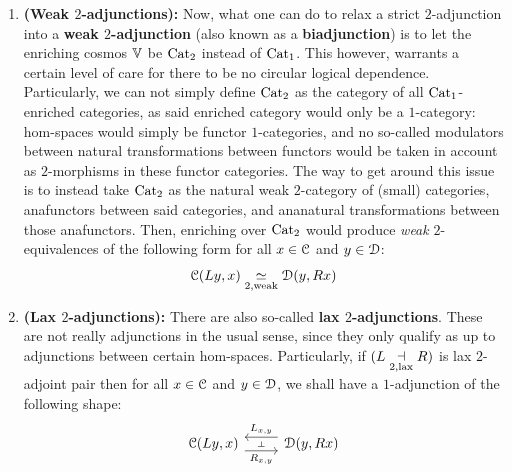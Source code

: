 \begin{remark}
\begin{enumerate}
                        \item \textbf{(Weak $2$-adjunctions):} Now, what one can do to relax a strict $2$-adjunction into a \textbf{weak $2$-adjunction} (also known as a \textbf{biadjunction}) is to let the enriching cosmos $\mathbb{V}$ be $\mathrm{Cat}_2$ instead of $\mathrm{Cat}_1$. This however, warrants a certain level of care for there to be no circular logical dependence. Particularly, we can not simply define $\mathrm{Cat}_2$ as the category of all $\mathrm{Cat}_1$-enriched categories, as said enriched category would only be a $1$-category: hom-spaces would simply be functor $1$-categories, and no so-called modulators between natural transformations between functors would be taken in account as $2$-morphisms in these functor categories. The way to get around this issue is to instead take $\mathrm{Cat}_2$ as the natural weak $2$-category of (small) categories, anafunctors between said categories, and ananatural transformations between those anafunctors. Then, enriching over $\mathrm{Cat}_2$ would produce \textit{weak} $2$-equivalences of the following form for all $x \in \mathcal{C}$ and $y \in \mathcal{D}$:
                            $$\mathcal{C}(Ly, x) \underset{2, \mathrm{weak}}{\simeq} \mathcal{D}(y, Rx)$$
                        \item \textbf{(Lax $2$-adjunctions):} There are also so-called \textbf{lax $2$-adjunctions}. These are not really adjunctions in the usual sense, since they only qualify as  up to adjunctions between certain hom-spaces. Particularly, if $(L \underset{2, \mathrm{lax}}{\dashv} R)$ is lax $2$-adjoint pair then for all $x \in \mathcal{C}$ and $y \in \mathcal{D}$, we shall have a $1$-adjunction of the following shape:
                            $$
                                \begin{tikzcd}
                                	{\C(Ly, x)} & {\D(y, Rx)}
                                	\arrow[""{name=0, anchor=center, inner sep=0}, "{R_{x, y}}"', shift right=2, from=1-1, to=1-2]
                                	\arrow[""{name=1, anchor=center, inner sep=0}, "{L_{x, y}}"', shift right=2, from=1-2, to=1-1]
                                	\arrow["\dashv"{anchor=center, rotate=-90}, draw=none, from=1, to=0]
                                \end{tikzcd}
                            $$
                    \end{enumerate}
                \end{remark}
